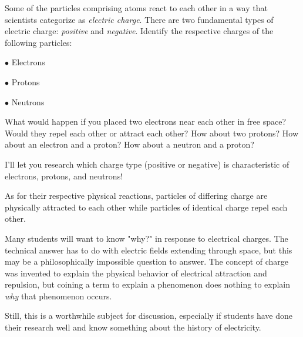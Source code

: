 

Some of the particles comprising atoms react to each other in a way that scientists categorize as {\it electric charge}.  There are two fundamental types of electric charge: {\it positive} and {\it negative}.  Identify the respective charges of the following particles:

\medskip
\item{$\bullet$} Electrons
\item{$\bullet$} Protons
\item{$\bullet$} Neutrons
\medskip

What would happen if you placed two electrons near each other in free space?  Would they repel each other or attract each other?  How about two protons?  How about an electron and a proton?  How about a neutron and a proton?







I'll let you research which charge type (positive or negative) is characteristic of electrons, protons, and neutrons!

As for their respective physical reactions, particles of differing charge are physically attracted to each other while particles of identical charge repel each other.







Many students will want to know "why?" in response to electrical charges.  The technical answer has to do with electric fields extending through space, but this may be a philosophically impossible question to answer.  The concept of charge was invented to explain the physical behavior of electrical attraction and repulsion, but coining a term to explain a phenomenon does nothing to explain {\it why} that phenomenon occurs.

Still, this is a worthwhile subject for discussion, especially if students have done their research well and know something about the history of electricity.




